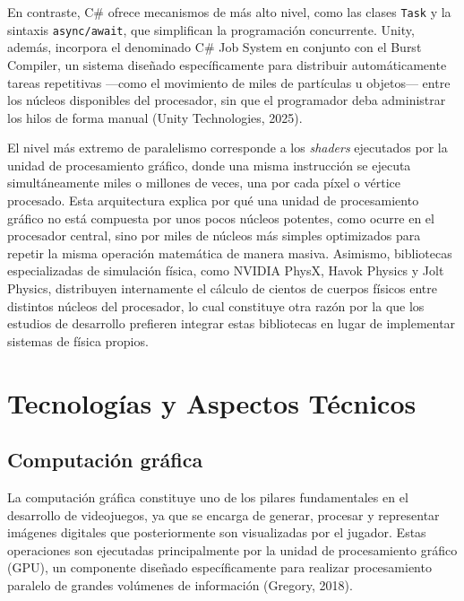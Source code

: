 \documentclass[12pt]{report}
\begin{document}
En contraste, C\# ofrece mecanismos de más alto nivel, como las clases \texttt{Task} y la sintaxis \texttt{async/await}, que simplifican la programación concurrente. Unity, además, incorpora el denominado C\# Job System en conjunto con el Burst Compiler, un sistema diseñado específicamente para distribuir automáticamente tareas repetitivas —como el movimiento de miles de partículas u objetos— entre los núcleos disponibles del procesador, sin que el programador deba administrar los hilos de forma manual (Unity Technologies, 2025).

El nivel más extremo de paralelismo corresponde a los \textit{shaders} ejecutados por la unidad de procesamiento gráfico, donde una misma instrucción se ejecuta simultáneamente miles o millones de veces, una por cada píxel o vértice procesado. Esta arquitectura explica por qué una unidad de procesamiento gráfico no está compuesta por unos pocos núcleos potentes, como ocurre en el procesador central, sino por miles de núcleos más simples optimizados para repetir la misma operación matemática de manera masiva. Asimismo, bibliotecas especializadas de simulación física, como NVIDIA PhysX, Havok Physics y Jolt Physics, distribuyen internamente el cálculo de cientos de cuerpos físicos entre distintos núcleos del procesador, lo cual constituye otra razón por la que los estudios de desarrollo prefieren integrar estas bibliotecas en lugar de implementar sistemas de física propios.

\chapter{Tecnologías y Aspectos Técnicos}

\section{Computación gráfica}

La computación gráfica constituye uno de los pilares fundamentales en el desarrollo de videojuegos, ya que se encarga de generar, procesar y representar imágenes digitales que posteriormente son visualizadas por el jugador. Estas operaciones son ejecutadas principalmente por la unidad de procesamiento gráfico (GPU), un componente diseñado específicamente para realizar procesamiento paralelo de grandes volúmenes de información (Gregory, 2018).
\end{document}

